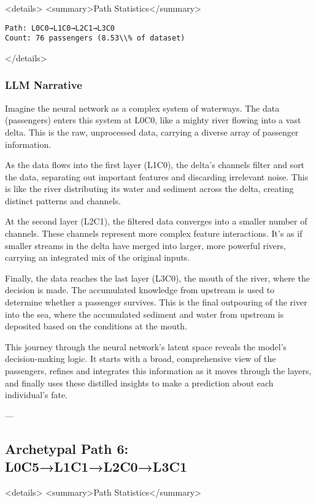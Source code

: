 <details>
<summary>Path Statistics</summary>

\begin{verbatim}
Path: L0C0→L1C0→L2C1→L3C0
Count: 76 passengers (8.53\\% of dataset)
\end{verbatim}
</details>

\subsubsection*{LLM Narrative}

Imagine the neural network as a complex system of waterways. The data (passengers) enters this system at L0C0, like a mighty river flowing into a vast delta. This is the raw, unprocessed data, carrying a diverse array of passenger information.

As the data flows into the first layer (L1C0), the delta's channels filter and sort the data, separating out important features and discarding irrelevant noise. This is like the river distributing its water and sediment across the delta, creating distinct patterns and channels.

At the second layer (L2C1), the filtered data converges into a smaller number of channels. These channels represent more complex feature interactions. It's as if smaller streams in the delta have merged into larger, more powerful rivers, carrying an integrated mix of the original inputs.

Finally, the data reaches the last layer (L3C0), the mouth of the river, where the decision is made. The accumulated knowledge from upstream is used to determine whether a passenger survives. This is the final outpouring of the river into the sea, where the accumulated sediment and water from upstream is deposited based on the conditions at the mouth.

This journey through the neural network's latent space reveals the model's decision-making logic. It starts with a broad, comprehensive view of the passengers, refines and integrates this information as it moves through the layers, and finally uses these distilled insights to make a prediction about each individual's fate.

---

\subsection*{Archetypal Path 6: L0C5→L1C1→L2C0→L3C1}

<details>
<summary>Path Statistics</summary>

